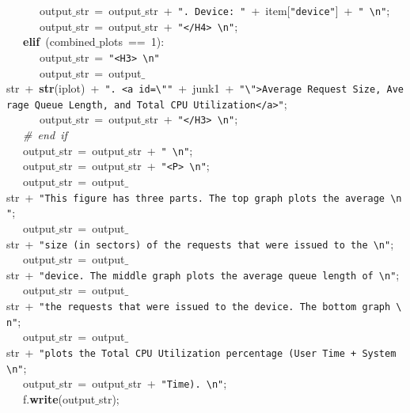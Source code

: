 \mbox{}\ \ \ \ \ \ output$\_$str\ =\ output$\_$str\ +\ \texttt{"{}.\ Device:\ "{}}\ +\ item[\texttt{"{}device"{}}]\ +\ \texttt{"{}\ \textbackslash{}n"{}}; \\
\mbox{}\ \ \ \ \ \ output$\_$str\ =\ output$\_$str\ +\ \texttt{"{}\textless{}/H4\textgreater{}\ \textbackslash{}n"{}}; \\
\mbox{}\ \ \ \textbf{elif}\ (combined$\_$plots\ ==\ 1): \\
\mbox{}\ \ \ \ \ \ output$\_$str\ =\ \texttt{"{}\textless{}H3\textgreater{}\ \textbackslash{}n"{}} \\
\mbox{}\ \ \ \ \ \ output$\_$str\ =\ output$\_$str\ +\ \textbf{str}(iplot)\ +\ \texttt{"{}.\ \textless{}a\ id=\textbackslash{}"{}"{}}\ +\ junk1\ +\ \texttt{"{}\textbackslash{}"{}\textgreater{}Average\ Request\ Size,\ Average\ Queue\ Length,\ and\ Total\ CPU\ Utilization\textless{}/a\textgreater{}"{}}; \\
\mbox{}\ \ \ \ \ \ output$\_$str\ =\ output$\_$str\ +\ \texttt{"{}\textless{}/H3\textgreater{}\ \textbackslash{}n"{}}; \\
\mbox{}\ \ \ \textit{\#\ end\ if} \\
\mbox{}\ \ \ output$\_$str\ =\ output$\_$str\ +\ \texttt{"{}\ \textbackslash{}n"{}}; \\
\mbox{}\ \ \ output$\_$str\ =\ output$\_$str\ +\ \texttt{"{}\textless{}P\textgreater{}\ \textbackslash{}n"{}}; \\
\mbox{}\ \ \ output$\_$str\ =\ output$\_$str\ +\ \texttt{"{}This\ figure\ has\ three\ parts.\ The\ top\ graph\ plots\ the\ average\ \textbackslash{}n"{}}; \\
\mbox{}\ \ \ output$\_$str\ =\ output$\_$str\ +\ \texttt{"{}size\ (in\ sectors)\ of\ the\ requests\ that\ were\ issued\ to\ the\ \textbackslash{}n"{}}; \\
\mbox{}\ \ \ output$\_$str\ =\ output$\_$str\ +\ \texttt{"{}device.\ The\ middle\ graph\ plots\ the\ average\ queue\ length\ of\ \textbackslash{}n"{}}; \\
\mbox{}\ \ \ output$\_$str\ =\ output$\_$str\ +\ \texttt{"{}the\ requests\ that\ were\ issued\ to\ the\ device.\ The\ bottom\ graph\ \textbackslash{}n"{}}; \\
\mbox{}\ \ \ output$\_$str\ =\ output$\_$str\ +\ \texttt{"{}plots\ the\ Total\ CPU\ Utilization\ percentage\ (User\ Time\ +\ System\ \textbackslash{}n"{}}; \\
\mbox{}\ \ \ output$\_$str\ =\ output$\_$str\ +\ \texttt{"{}Time).\ \textbackslash{}n"{}}; \\
\mbox{}\ \ \ f.\textbf{write}(output$\_$str); \\
